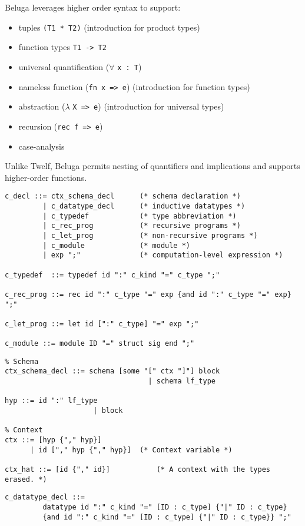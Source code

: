 \documentclass[11pt]{article}
\begin{document}
Beluga leverages higher order syntax to support:
\begin{itemize}
\item tuples \verb+(T1 * T2)+ (introduction for product types)
\item function types \verb+T1 -> T2+
\item universal quantification ($\forall$ \verb+x : T+)
\item nameless function (\verb+fn x => e+) (introduction for function types)
\item abstraction ($\lambda$ \verb+X => e+) (introduction for universal types)
\item recursion (\verb+rec f => e+)
\item case-analysis
\end{itemize}
Unlike Twelf, Beluga permits nesting of quantifiers and implications and supports higher-order functions.

\begin{verbatim}
c_decl ::= ctx_schema_decl      (* schema declaration *)
         | c_datatype_decl      (* inductive datatypes *)
         | c_typedef            (* type abbreviation *)
         | c_rec_prog           (* recursive programs *)
         | c_let_prog           (* non-recursive programs *)
         | c_module             (* module *)
         | exp ";"              (* computation-level expression *)

c_typedef  ::= typedef id ":" c_kind "=" c_type ";"

c_rec_prog ::= rec id ":" c_type "=" exp {and id ":" c_type "=" exp} ";"

c_let_prog ::= let id [":" c_type] "=" exp ";"

c_module ::= module ID "=" struct sig end ";"
\end{verbatim}

\begin{verbatim}
% Schema
ctx_schema_decl ::= schema [some "[" ctx "]"] block
                                  | schema lf_type

hyp ::= id ":" lf_type
                     | block

% Context
ctx ::= [hyp {"," hyp}]
      | id ["," hyp {"," hyp}]  (* Context variable *)

ctx_hat ::= [id {"," id}]           (* A context with the types erased. *)
\end{verbatim}

\begin{verbatim}
c_datatype_decl ::=
         datatype id ":" c_kind "=" [ID : c_type] {"|" ID : c_type}
         {and id ":" c_kind "=" [ID : c_type] {"|" ID : c_type}} ";"
\end{verbatim}
\end{document}
